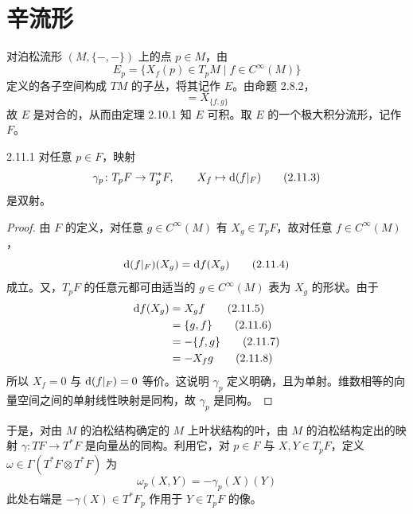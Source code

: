 
\section{辛流形}

对泊松流形 $(M,\{-,-\})$ 上的点 $p\in M$，由
\begin{equation}
  E_p = \{X_f(p)\in T_pM\mid f\in C^\infty(M)\}
  \tag{2.11.1}
\end{equation}
定义的各子空间构成 $TM$ 的子丛，将其记作 $E$。由命题 2.8.2，
\begin{equation}
  [X_f,X_g] = X_{\{f,g\}}
  \tag{2.11.2}
\end{equation}
故 $E$ 是对合的，从而由定理 2.10.1 知 $E$ 可积。取 $E$ 的一个极大积分流形，记作 $F$。

\begin{proposition*}{2.11.1}
对任意 $p\in F$，映射
\begin{equation}
  \gamma_p\colon T_pF\to T_p^*F,\qquad X_f\mapsto \mathrm{d}(f|_F)
  \tag{2.11.3}
\end{equation}
是双射。
\end{proposition*}

\begin{proof}
由 $F$ 的定义，对任意 $g\in C^\infty(M)$ 有 $X_g\in T_pF$，故对任意 $f\in C^\infty(M)$，
\begin{equation}
  \mathrm{d}(f|_F)(X_g) = \mathrm{d} f(X_g)
  \tag{2.11.4}
\end{equation}
成立。又，$T_pF$ 的任意元都可由适当的 $g\in C^\infty(M)$ 表为 $X_g$ 的形状。由于
\begin{align}
  \mathrm{d} f(X_g) &= X_gf
  \tag{2.11.5}\\
  &= \{g,f\}
  \tag{2.11.6}\\
  &= -\{f,g\}
  \tag{2.11.7}\\
  &= -X_fg
  \tag{2.11.8}
\end{align}
所以 $X_f=0$ 与 $\mathrm{d}(f|_F)=0$ 等价。这说明 $\gamma_p$ 定义明确，且为单射。维数相等的向量空间之间的单射线性映射是同构，故 $\gamma_p$ 是同构。
\end{proof}

于是，对由 $M$ 的泊松结构确定的 $M$ 上叶状结构的叶，由 $M$ 的泊松结构定出的映射 $\gamma\colon TF\to T^*F$ 是向量丛的同构。利用它，对 $p\in F$ 与 $X,Y\in T_pF$，定义 $\omega\in\Gamma(T^*F\otimes T^*F)$ 为
\begin{equation}
  \omega_p(X,Y) = -\gamma_p(X)(Y)
  \tag{2.11.9}
\end{equation}
此处右端是 $-\gamma(X)\in T^*F_p$ 作用于 $Y\in T_pF$ 的像。

